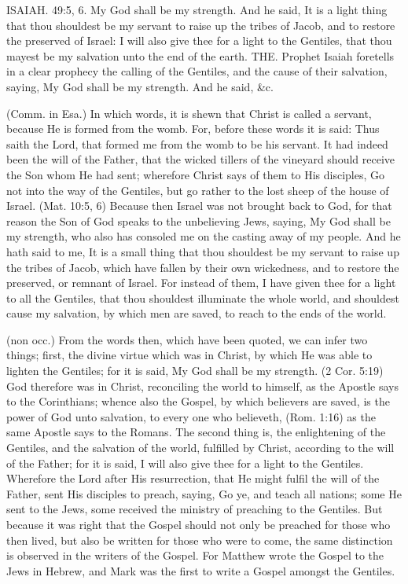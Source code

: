 
ISAIAH. 49:5, 6. My God shall be my strength. And he said, It is a light thing that thou shouldest be my servant to raise up the tribes of Jacob, and to restore the preserved of Israel: I will also give thee for a light to the Gentiles, that thou mayest be my salvation unto the end of the earth. THE. Prophet Isaiah foretells in a clear prophecy the calling of the Gentiles, and the cause of their salvation, saying, My God shall be my strength. And he said, \&c.

 (Comm. in Esa.) In which words, it is shewn that Christ is called a servant, because He is formed from the womb. For, before these words it is said: Thus saith the Lord, that formed me from the womb to be his servant. It had indeed been the will of the Father, that the wicked tillers of the vineyard should receive the Son whom He had sent; wherefore Christ says of them to His disciples, Go not into the way of the Gentiles, but go rather to the lost sheep of the house of Israel. (Mat. 10:5, 6) Because then Israel was not brought back to God, for that reason the Son of God speaks to the unbelieving Jews, saying, My God shall be my strength, who also has consoled me on the casting away of my people. And he hath said to me, It is a small thing that thou shouldest be my servant to raise up the tribes of Jacob, which have fallen by their own wickedness, and to restore the preserved, or remnant of Israel. For instead of them, I have given thee for a light to all the Gentiles, that thou shouldest illuminate the whole world, and shouldest cause my salvation, by which men are saved, to reach to the ends of the world.

 (non occ.) From the words then, which have been quoted, we can infer two things; first, the divine virtue which was in Christ, by which He was able to lighten the Gentiles; for it is said, My God shall be my strength. (2 Cor. 5:19) God therefore was in Christ, reconciling the world to himself, as the Apostle says to the Corinthians; whence also the Gospel, by which believers are saved, is the power of God unto salvation, to every one who believeth, (Rom. 1:16) as the same Apostle says to the Romans. The second thing is, the enlightening of the Gentiles, and the salvation of the world, fulfilled by Christ, according to the will of the Father; for it is said, I will also give thee for a light to the Gentiles. Wherefore the Lord after His resurrection, that He might fulfil the will of the Father, sent His disciples to preach, saying, Go ye, and teach all nations; some He sent to the Jews, some received the ministry of preaching to the Gentiles. But because it was right that the Gospel should not only be preached for those who then lived, but also be written for those who were to come, the same distinction is observed in the writers of the Gospel. For Matthew wrote the Gospel to the Jews in Hebrew, and Mark was the first to write a Gospel amongst the Gentiles.

